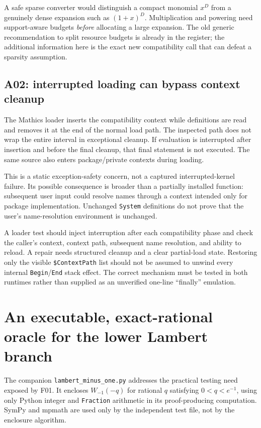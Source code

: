 \documentclass[11pt,letterpaper]{article}
\newcommand{\code}[1]{\texttt{#1}}
\begin{document}
A safe sparse converter would distinguish a compact monomial $x^D$ from a genuinely dense expansion such as $(1+x)^D$. Multiplication and powering need support-aware budgets \emph{before} allocating a large expansion. The old generic recommendation to split resource budgets is already in the register; the additional information here is the exact new compatibility call that can defeat a sparsity assumption.~\cite{register}

\subsection{A02: interrupted loading can bypass context cleanup}

The Mathics loader inserts the compatibility context while definitions are read and removes it at the end of the normal load path. The inspected path does not wrap the entire interval in exceptional cleanup. If evaluation is interrupted after insertion and before the final cleanup, that final statement is not executed. The same source also enters package/private contexts during loading.~\cite{core,mathics-compat}

This is a static exception-safety concern, not a captured interrupted-kernel failure. Its possible consequence is broader than a partially installed function: subsequent user input could resolve names through a context intended only for package implementation. Unchanged \code{System} definitions do not prove that the user's name-resolution environment is unchanged.

A loader test should inject interruption after each compatibility phase and check the caller's context, context path, subsequent name resolution, and ability to reload. A repair needs structured cleanup and a clear partial-load state. Restoring only the visible \code{\$ContextPath} list should not be assumed to unwind every internal \code{Begin}/\code{End} stack effect. The correct mechanism must be tested in both runtimes rather than supplied as an unverified one-line ``finally'' emulation.

\section{An executable, exact-rational oracle for the lower Lambert branch}
\label{sec:certificate}

The companion \code{lambert\_minus\_one.py} addresses the practical testing need exposed by F01. It encloses $W_{-1}(-q)$ for rational $q$ satisfying $0<q<e^{-1}$, using only Python integer and \code{Fraction} arithmetic in its proof-producing computation. SymPy and mpmath are used only by the independent test file, not by the enclosure algorithm.
\end{document}
